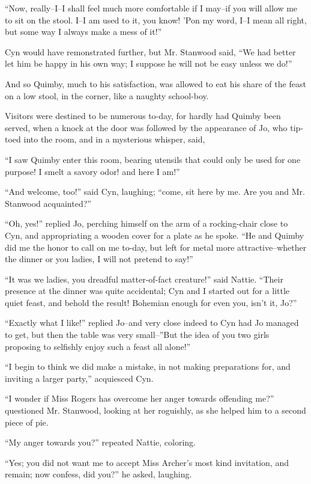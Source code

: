 ``Now, really--I--I shall feel much more comfortable if I may--if you
will allow me to sit on the stool. I--I am used to it, you know! 'Pon my
word, I--I mean all right, but some way I always make a mess of it!''

Cyn would have remonstrated further, but Mr. Stanwood said, ``We had
better let him be happy in his own way; I suppose he will not be easy
unless we do!''

And so Quimby, much to his satisfaction, was allowed to eat his share of
the feast on a low stool, in the corner, like a naughty school-boy.

Visitors were destined to be numerous to-day, for hardly had Quimby been
served, when a knock at the door was followed by the appearance of Jo,
who tip-toed into the room, and in a mysterious whisper, said,

``I saw Quimby enter this room, bearing utensils that could only be used
for one purpose! I smelt a savory odor! and here I am!''

``And welcome, too!'' said Cyn, laughing; ``come, sit here by me. Are you
and Mr. Stanwood acquainted?''

``Oh, yes!'' replied Jo, perching himself on the arm of a rocking-chair
close to Cyn, and appropriating a wooden cover for a plate as he spoke.
``He and Quimby did me the honor to call on me to-day, but left for metal
more attractive--whether the dinner or you ladies, I will not pretend to
say!''

``It was we ladies, you dreadful matter-of-fact creature!'' said Nattie.
``Their presence at the dinner was quite accidental; Cyn and I started
out for a little quiet feast, and behold the result! Bohemian enough for
even you, isn't it, Jo?''

``Exactly what I like!'' replied Jo--and very close indeed to Cyn had Jo
managed to get, but then the table was very small--''But the idea of you
two girls proposing to selfishly enjoy such a feast all alone!''

``I begin to think we did make a mistake, in not making preparations for,
and inviting a larger party,'' acquiesced Cyn.

``I wonder if Miss Rogers has overcome her anger towards offending me?''
questioned Mr. Stanwood, looking at her roguishly, as she helped him to
a second piece of pie.

``My anger towards you?'' repeated Nattie, coloring.

``Yes; you did not want me to accept Miss Archer's most kind invitation,
and remain; now confess, did you?'' he asked, laughing.

